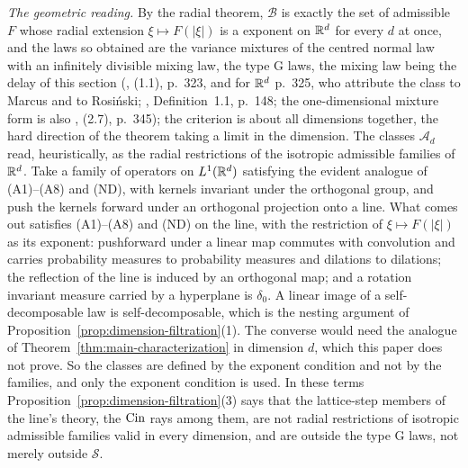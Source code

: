 \begin{remark}\label{rem:dimension-filtration}
\emph{The geometric reading.} By the radial theorem, $\mathcal{B}$ is exactly the set of
admissible $F$ whose radial extension $\xi \mapsto F(|\xi|)$ is a \Levy{} exponent on $\mathbb{R}^d$
for every $d$ at once, and the laws so obtained are the variance mixtures of the centred normal
law with an infinitely divisible mixing law, the type G laws, the mixing law being the delay of
this section (, (1.1), p.~323, and for $\mathbb{R}^d$ p.~325, who attribute the class to
Marcus and to Rosi\'nski; , Definition~1.1, p.~148; the
one-dimensional mixture form is also , (2.7), p.~345); the criterion is about all
dimensions together, the hard direction of the theorem taking a limit in the dimension. The
classes $\mathcal{A}_d$ read, heuristically, as the radial restrictions of the isotropic
admissible families of $\mathbb{R}^d$. Take a family of operators on $L^1(\mathbb{R}^d)$ satisfying the evident
analogue of (A1)--(A8) and (ND), with kernels invariant under the orthogonal group, and push the
kernels forward under an orthogonal projection onto a line. What comes out satisfies (A1)--(A8)
and (ND) on the line, with the restriction of $\xi \mapsto F(|\xi|)$ as its exponent: pushforward
under a linear map commutes with convolution and carries probability measures to probability
measures and dilations to dilations; the reflection of the line is induced by an orthogonal map;
and a rotation invariant measure carried by a hyperplane is $\delta_0$. A linear
image of a self-decomposable law is self-decomposable, which is the nesting argument of
Proposition~\ref{prop:dimension-filtration}(1). The converse would need the analogue of
Theorem~\ref{thm:main-characterization} in dimension $d$, which this paper does not prove. So the
classes are defined by the exponent condition and not by the families, and only the exponent
condition is used. In these terms Proposition~\ref{prop:dimension-filtration}(3) says that the lattice-step members
of the line's theory, the $\operatorname{Cin}$ rays among them, are not radial restrictions of isotropic
admissible families valid in every dimension, and are outside the type G laws, not merely
outside $\mathcal{S}$.


\end{remark}
